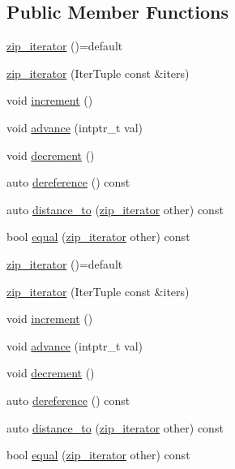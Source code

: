 \subsection*{Public Member Functions}
\begin{DoxyCompactItemize}
\item 
\mbox{\hyperlink{structrah_1_1view_1_1zip__iterator_a8ba7af8259dc507b57d1e3371c7f40a2}{zip\+\_\+iterator}} ()=default
\item 
\mbox{\hyperlink{structrah_1_1view_1_1zip__iterator_a2f6b7c790bcb819a68e4828f6bd6ef79}{zip\+\_\+iterator}} (Iter\+Tuple const \&iters)
\item 
void \mbox{\hyperlink{structrah_1_1view_1_1zip__iterator_a156b181d725c31af3c34180806d6428e}{increment}} ()
\item 
void \mbox{\hyperlink{structrah_1_1view_1_1zip__iterator_abc9b6f7ff787d1a08c4a327d738a1809}{advance}} (intptr\+\_\+t val)
\item 
void \mbox{\hyperlink{structrah_1_1view_1_1zip__iterator_a5618c02a5596c1306d1abc0b1413f086}{decrement}} ()
\item 
auto \mbox{\hyperlink{structrah_1_1view_1_1zip__iterator_a775ecbdf57e02dd926e5b83f0a3bd8c1}{dereference}} () const
\item 
auto \mbox{\hyperlink{structrah_1_1view_1_1zip__iterator_a01c298bede994df318d47205c50cc461}{distance\+\_\+to}} (\mbox{\hyperlink{structrah_1_1view_1_1zip__iterator}{zip\+\_\+iterator}} other) const
\item 
bool \mbox{\hyperlink{structrah_1_1view_1_1zip__iterator_ab8712d7266cdc63143e61841fa371179}{equal}} (\mbox{\hyperlink{structrah_1_1view_1_1zip__iterator}{zip\+\_\+iterator}} other) const
\item 
\mbox{\hyperlink{structrah_1_1view_1_1zip__iterator_a8ba7af8259dc507b57d1e3371c7f40a2}{zip\+\_\+iterator}} ()=default
\item 
\mbox{\hyperlink{structrah_1_1view_1_1zip__iterator_a2f6b7c790bcb819a68e4828f6bd6ef79}{zip\+\_\+iterator}} (Iter\+Tuple const \&iters)
\item 
void \mbox{\hyperlink{structrah_1_1view_1_1zip__iterator_a156b181d725c31af3c34180806d6428e}{increment}} ()
\item 
void \mbox{\hyperlink{structrah_1_1view_1_1zip__iterator_abc9b6f7ff787d1a08c4a327d738a1809}{advance}} (intptr\+\_\+t val)
\item 
void \mbox{\hyperlink{structrah_1_1view_1_1zip__iterator_a5618c02a5596c1306d1abc0b1413f086}{decrement}} ()
\item 
auto \mbox{\hyperlink{structrah_1_1view_1_1zip__iterator_a775ecbdf57e02dd926e5b83f0a3bd8c1}{dereference}} () const
\item 
auto \mbox{\hyperlink{structrah_1_1view_1_1zip__iterator_a01c298bede994df318d47205c50cc461}{distance\+\_\+to}} (\mbox{\hyperlink{structrah_1_1view_1_1zip__iterator}{zip\+\_\+iterator}} other) const
\item 
bool \mbox{\hyperlink{structrah_1_1view_1_1zip__iterator_ab8712d7266cdc63143e61841fa371179}{equal}} (\mbox{\hyperlink{structrah_1_1view_1_1zip__iterator}{zip\+\_\+iterator}} other) const
\end{DoxyCompactItemize}
